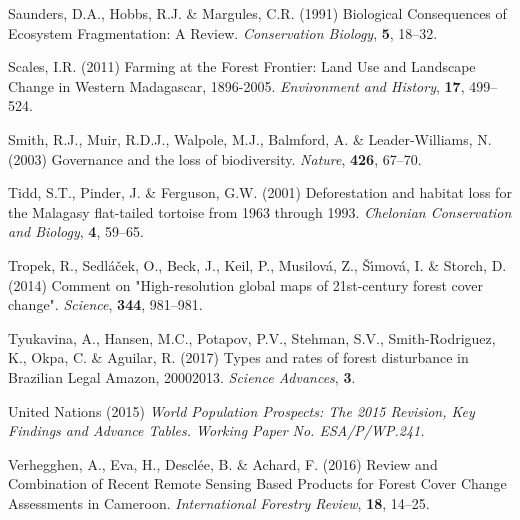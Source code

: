 \documentclass[a4paper, 12pt, leqno]{article} %
\begin{document}
\begin{thebibliography}{55}
Saunders, D.A., Hobbs, R.J. \& Margules, C.R. (1991) {Biological Consequences
  of Ecosystem Fragmentation: A Review}.
\newblock \emph{Conservation Biology}, \textbf{5}, 18--32.

Scales, I.R. (2011) {Farming at the Forest Frontier: Land Use and Landscape
  Change in Western Madagascar, 1896-2005}.
  \newblock \emph{Environment and History}, \textbf{17}, 499--524.

Smith, R.J., Muir, R.D.J., Walpole, M.J., Balmford, A. \& Leader-Williams, N.
  (2003) Governance and the loss of biodiversity.
\newblock \emph{Nature}, \textbf{426}, 67--70.

Tidd, S.T., Pinder, J. \& Ferguson, G.W. (2001) {Deforestation and habitat loss
  for the Malagasy flat-tailed tortoise from 1963 through 1993}.
\newblock \emph{Chelonian Conservation and Biology}, \textbf{4}, 59--65.

Tropek, R., Sedl{\'a}{\v c}ek, O., Beck, J., Keil, P., Musilov{\'a}, Z., {\v
  S}{\'\i}mov{\'a}, I. \& Storch, D. (2014) {Comment on "High-resolution global
  maps of 21st-century forest cover change"}.
\newblock \emph{Science}, \textbf{344}, 981--981.

Tyukavina, A., Hansen, M.C., Potapov, P.V., Stehman, S.V., Smith-Rodriguez, K.,
  Okpa, C. \& Aguilar, R. (2017) {Types and rates of forest disturbance in
  Brazilian Legal Amazon, 2000{\textendash}2013}.
\newblock \emph{Science Advances}, \textbf{3}.

{United Nations} (2015) \emph{{World Population Prospects: The 2015 Revision,
  Key Findings and Advance Tables. Working Paper No. ESA/P/WP.241.}}

Verhegghen, A., Eva, H., Desclée, B. \& Achard, F. (2016) {Review and
  Combination of Recent Remote Sensing Based Products for Forest Cover Change
  Assessments in Cameroon}.
\newblock \emph{International Forestry Review}, \textbf{18}, 14--25.


\end{thebibliography}
\end{document}
